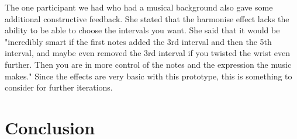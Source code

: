 The one participant we had who had a musical background also gave some additional constructive feedback. She stated that the harmonise effect lacks the ability to be able to choose the intervals you want. She said that it would be "incredibly smart if the first notes added the 3rd interval and then the 5th interval, and maybe even removed the 3rd interval if you twisted the wrist even further. Then you are in more control of the notes and the expression the music makes." Since the effects are very basic with this prototype, this is something to consider for further iterations. 

\section{Conclusion}
